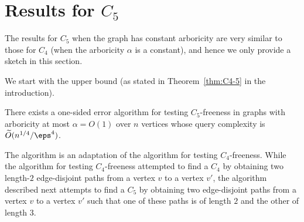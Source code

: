 \section{Results for $C_5$}\label{sec:C5}

The results for $C_5$ when the graph has constant arboricity are very similar to those for $C_4$ (when the arboricity $\alpha$ is a constant), and hence we only provide a sketch in this section.

We start with the upper bound (as stated in Theorem~\ref{thm:C4-5} in the introduction).
\begin{theorem}\label{thm:C5-ub}
There exists a one-sided error algorithm for testing $C_5$-freeness in graphs with  arboricity at most $\alpha = O(1)$ over $n$ vertices whose query complexity is $\widetilde{O}(n^{1/4}/\eps^{4})$. 
\end{theorem}

The algorithm is an adaptation of the algorithm for testing $C_4$-freeness.
 While the algorithm for testing $C_4$-freeness attempted to find a $C_4$ by obtaining two length-$2$ edge-disjoint paths from a vertex $v$ to a vertex $v'$, the algorithm described next
 attempts to find a $C_5$ by obtaining two edge-disjoint paths from a vertex $v$ to a vertex $v'$ such that one of these paths is of length $2$ and the other of length $3$.


